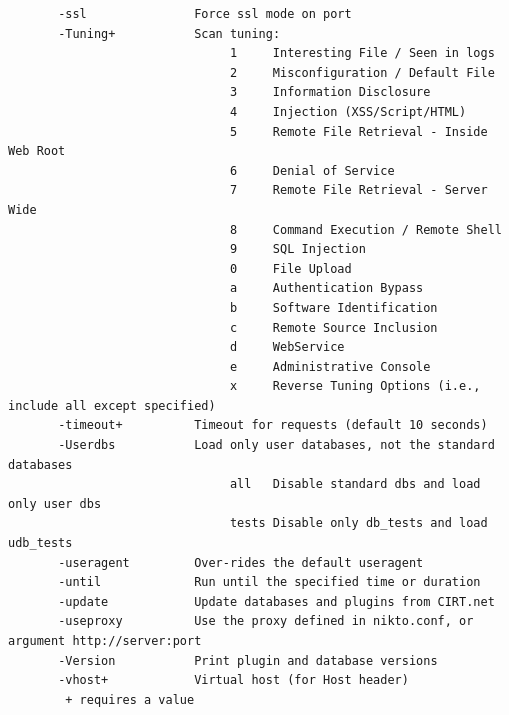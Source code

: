 \documentclass{article}
\begin{document}
\begin{lstlisting}
       -ssl               Force ssl mode on port
       -Tuning+           Scan tuning:
                               1     Interesting File / Seen in logs
                               2     Misconfiguration / Default File
                               3     Information Disclosure
                               4     Injection (XSS/Script/HTML)
                               5     Remote File Retrieval - Inside Web Root
                               6     Denial of Service
                               7     Remote File Retrieval - Server Wide
                               8     Command Execution / Remote Shell
                               9     SQL Injection
                               0     File Upload
                               a     Authentication Bypass
                               b     Software Identification
                               c     Remote Source Inclusion
                               d     WebService
                               e     Administrative Console
                               x     Reverse Tuning Options (i.e., include all except specified)
       -timeout+          Timeout for requests (default 10 seconds)
       -Userdbs           Load only user databases, not the standard databases
                               all   Disable standard dbs and load only user dbs
                               tests Disable only db_tests and load udb_tests
       -useragent         Over-rides the default useragent
       -until             Run until the specified time or duration
       -update            Update databases and plugins from CIRT.net
       -useproxy          Use the proxy defined in nikto.conf, or argument http://server:port
       -Version           Print plugin and database versions
       -vhost+            Virtual host (for Host header)
   		+ requires a value
\end{lstlisting}
\end{document}
